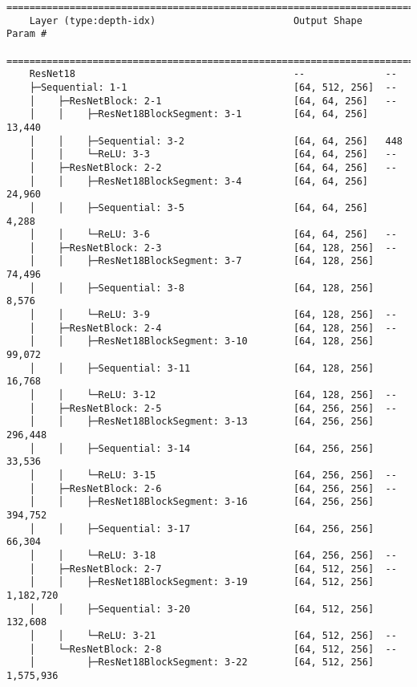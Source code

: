 \newpage
\begin{lstlisting}[caption=\acrfull{resnet18}]
    ===========================================================================
    Layer (type:depth-idx)                        Output Shape    Param #
    ===========================================================================
    ResNet18                                      --              --
    ├─Sequential: 1-1                             [64, 512, 256]  --
    │    ├─ResNetBlock: 2-1                       [64, 64, 256]   --
    │    │    ├─ResNet18BlockSegment: 3-1         [64, 64, 256]   13,440
    │    │    ├─Sequential: 3-2                   [64, 64, 256]   448
    │    │    └─ReLU: 3-3                         [64, 64, 256]   --
    │    ├─ResNetBlock: 2-2                       [64, 64, 256]   --
    │    │    ├─ResNet18BlockSegment: 3-4         [64, 64, 256]   24,960
    │    │    ├─Sequential: 3-5                   [64, 64, 256]   4,288
    │    │    └─ReLU: 3-6                         [64, 64, 256]   --
    │    ├─ResNetBlock: 2-3                       [64, 128, 256]  --
    │    │    ├─ResNet18BlockSegment: 3-7         [64, 128, 256]  74,496
    │    │    ├─Sequential: 3-8                   [64, 128, 256]  8,576
    │    │    └─ReLU: 3-9                         [64, 128, 256]  --
    │    ├─ResNetBlock: 2-4                       [64, 128, 256]  --
    │    │    ├─ResNet18BlockSegment: 3-10        [64, 128, 256]  99,072
    │    │    ├─Sequential: 3-11                  [64, 128, 256]  16,768
    │    │    └─ReLU: 3-12                        [64, 128, 256]  --
    │    ├─ResNetBlock: 2-5                       [64, 256, 256]  --
    │    │    ├─ResNet18BlockSegment: 3-13        [64, 256, 256]  296,448
    │    │    ├─Sequential: 3-14                  [64, 256, 256]  33,536
    │    │    └─ReLU: 3-15                        [64, 256, 256]  --
    │    ├─ResNetBlock: 2-6                       [64, 256, 256]  --
    │    │    ├─ResNet18BlockSegment: 3-16        [64, 256, 256]  394,752
    │    │    ├─Sequential: 3-17                  [64, 256, 256]  66,304
    │    │    └─ReLU: 3-18                        [64, 256, 256]  --
    │    ├─ResNetBlock: 2-7                       [64, 512, 256]  --
    │    │    ├─ResNet18BlockSegment: 3-19        [64, 512, 256]  1,182,720
    │    │    ├─Sequential: 3-20                  [64, 512, 256]  132,608
    │    │    └─ReLU: 3-21                        [64, 512, 256]  --
    │    └─ResNetBlock: 2-8                       [64, 512, 256]  --
    │         ├─ResNet18BlockSegment: 3-22        [64, 512, 256]  1,575,936

\end{lstlisting}
